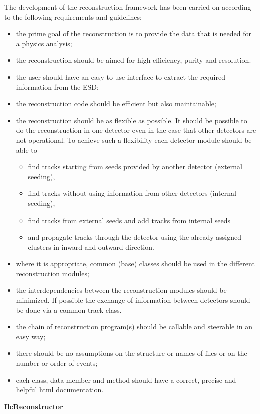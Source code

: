 \documentclass[12pt,a4paper,twoside]{article}
\begin{document}
The development of the reconstruction framework has been carried on
according to the following requirements and guidelines:
\begin{itemize}
\item the prime goal of the reconstruction is to provide the data that
  is needed for a  physics analysis; 
\item the reconstruction should be aimed for high efficiency, purity and resolution.
\item the user should have an easy to use interface to extract the
  required information from the ESD; 
\item the reconstruction code should be efficient but also maintainable;
\item the reconstruction should be as flexible as possible.
  It should be possible to do the reconstruction in one detector even in
  the case that other detectors are not operational. 
  To achieve such a flexibility each detector module should be able to
  \begin{itemize}
  \item find tracks starting from seeds provided by another detector
    (external seeding), 
  \item find tracks without using information from other detectors
    (internal seeding), 
  \item find tracks from external seeds and add tracks from internal seeds
  \item and propagate tracks through the detector using the already
    assigned clusters in inward and outward direction. 
  \end{itemize}
\item where it is appropriate, common (base) classes should be used in
  the different reconstruction modules;
\item the interdependencies between the reconstruction modules should
  be minimized. 
  If possible the exchange of information between detectors should be
  done via a common track class. 
\item the chain of reconstruction program(s) should be callable and
  steerable in an easy way;
\item there should be no assumptions on the structure or names of files
  or on the number or order of events;
\item each class, data member and method should have a correct,
  precise and helpful html documentation. 
\end{itemize}


\noindent
\textbf{IlcReconstructor}
\end{document}
